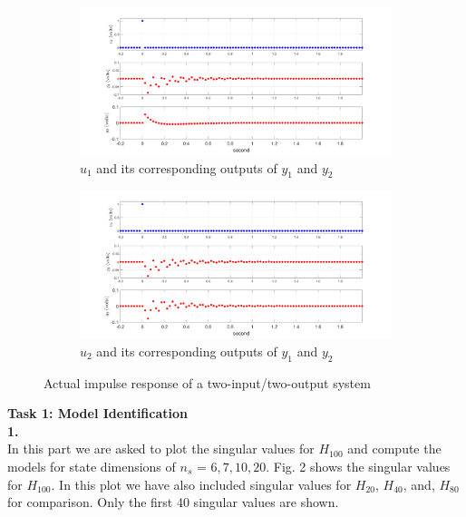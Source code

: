 \documentclass[paper=US leter, fontsize=11pt]{scrartcl}
\begin{document}
 \begin{figure}[ht!]\label{task0}   
	\centering  
	\begin{subfigure}{1\textwidth}  
		\centering  
		\includegraphics[scale=0.3,trim={4cm 0 0 0},clip]{task01.png}  
		\caption{$u_{1}$ and its corresponding outputs of $y_{1}$ and $y_{2}$  } 
	\end{subfigure}   
	
	\begin{subfigure}{1\textwidth}  
		\centering  
		\includegraphics[scale=0.3,trim={4cm 0 0 0},clip]{task02.png}  
		\caption{$u_{2}$ and its corresponding outputs of $y_{1}$ and $y_{2}$  }   
	\end{subfigure}  
	\caption{Actual impulse response of a two-input/two-output system} 
\end{figure} 
\clearpage
\textbf{Task 1: Model Identification}\\
\textbf{1.}\\
In this part we are asked to plot the singular values for $H_{100}$ and compute the models for state dimensions of $n_{s}$ = ${6, 7,10, 20}$. Fig. 2 shows the singular values for $H_{100}$. In this plot we have also included singular values for $H_{20}$, $H_{40}$, and, $H_{80}$ for comparison. Only the first 40 singular values are shown. 
\end{document}
